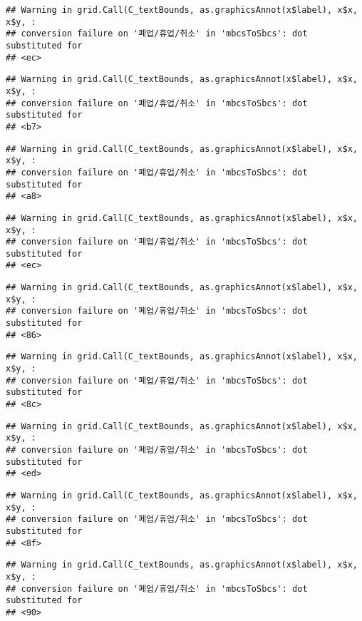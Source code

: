 \documentclass[
]{book}
\begin{document}
\begin{verbatim}
## Warning in grid.Call(C_textBounds, as.graphicsAnnot(x$label), x$x, x$y, :
## conversion failure on '폐업/휴업/취소' in 'mbcsToSbcs': dot substituted for
## <ec>
\end{verbatim}

\begin{verbatim}
## Warning in grid.Call(C_textBounds, as.graphicsAnnot(x$label), x$x, x$y, :
## conversion failure on '폐업/휴업/취소' in 'mbcsToSbcs': dot substituted for
## <b7>
\end{verbatim}

\begin{verbatim}
## Warning in grid.Call(C_textBounds, as.graphicsAnnot(x$label), x$x, x$y, :
## conversion failure on '폐업/휴업/취소' in 'mbcsToSbcs': dot substituted for
## <a8>
\end{verbatim}

\begin{verbatim}
## Warning in grid.Call(C_textBounds, as.graphicsAnnot(x$label), x$x, x$y, :
## conversion failure on '폐업/휴업/취소' in 'mbcsToSbcs': dot substituted for
## <ec>
\end{verbatim}

\begin{verbatim}
## Warning in grid.Call(C_textBounds, as.graphicsAnnot(x$label), x$x, x$y, :
## conversion failure on '폐업/휴업/취소' in 'mbcsToSbcs': dot substituted for
## <86>
\end{verbatim}

\begin{verbatim}
## Warning in grid.Call(C_textBounds, as.graphicsAnnot(x$label), x$x, x$y, :
## conversion failure on '폐업/휴업/취소' in 'mbcsToSbcs': dot substituted for
## <8c>
\end{verbatim}

\begin{verbatim}
## Warning in grid.Call(C_textBounds, as.graphicsAnnot(x$label), x$x, x$y, :
## conversion failure on '폐업/휴업/취소' in 'mbcsToSbcs': dot substituted for
## <ed>
\end{verbatim}

\begin{verbatim}
## Warning in grid.Call(C_textBounds, as.graphicsAnnot(x$label), x$x, x$y, :
## conversion failure on '폐업/휴업/취소' in 'mbcsToSbcs': dot substituted for
## <8f>
\end{verbatim}

\begin{verbatim}
## Warning in grid.Call(C_textBounds, as.graphicsAnnot(x$label), x$x, x$y, :
## conversion failure on '폐업/휴업/취소' in 'mbcsToSbcs': dot substituted for
## <90>
\end{verbatim}
\end{document}

